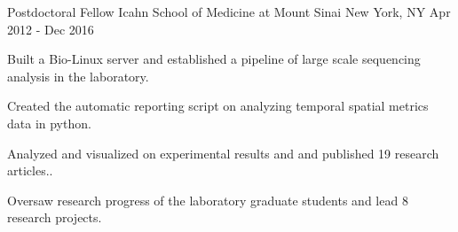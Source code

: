 \begin{cventries}
	\cventry
	{Postdoctoral Fellow} %
	{Icahn School of Medicine at Mount Sinai} %
	{New York, NY} %
	{Apr 2012 - Dec 2016} %
	{
		\begin{cvitems} %
			\item {Built a Bio-Linux server and established a pipeline of large scale sequencing analysis in the laboratory.}
			\item {Created the automatic reporting script on analyzing temporal spatial metrics data in python.}
			\item {Analyzed and visualized  on experimental results and and published 19 research articles..}
			\item {Oversaw research progress of the laboratory graduate students and lead 8 research projects.}
		\end{cvitems}
	}



\end{cventries}
